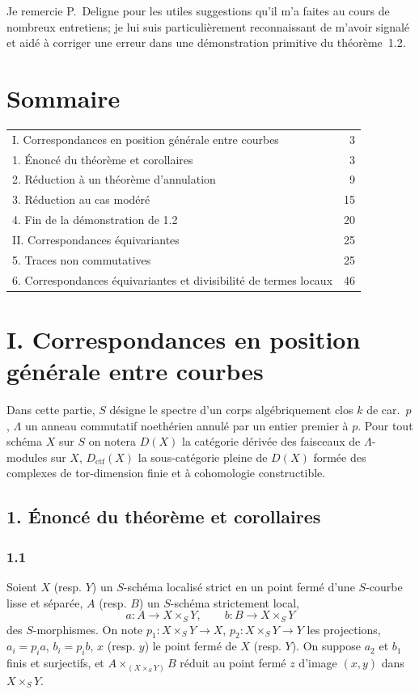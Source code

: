 \documentclass[11pt]{article}
\providecommand{\ctf}{\mathrm{ctf}}
\begin{document}
Je remercie P.~Deligne pour les utiles suggestions qu'il m'a faites au cours de nombreux entretiens; je lui suis particulièrement reconnaissant de m'avoir signalé et aidé à corriger une erreur dans une démonstration primitive du théorème~1.2.

\section*{Sommaire}
\begin{tabular}{@{}p{}r@{}}
I. Correspondances en position générale entre courbes & 3\\
1. Énoncé du théorème et corollaires & 3\\
2. Réduction à un théorème d'annulation & 9\\
3. Réduction au cas modéré & 15\\
4. Fin de la démonstration de 1.2 & 20\\
II. Correspondances équivariantes & 25\\
5. Traces non commutatives & 25\\
6. Correspondances équivariantes et divisibilité de termes locaux & 46
\end{tabular}

\section*{I. Correspondances en position générale entre courbes}

Dans cette partie, $S$ désigne le spectre d'un corps algébriquement clos $k$ de car.~$p$, $\Lambda$ un anneau commutatif noethérien annulé par un entier premier à $p$. Pour tout schéma $X$ sur $S$ on notera $D(X)$ la catégorie dérivée des faisceaux de $\Lambda$-modules sur $X$, $D_{\ctf}(X)$ la sous-catégorie pleine de $D(X)$ formée des complexes de tor-dimension finie et à cohomologie constructible.

\subsection*{1. Énoncé du théorème et corollaires}

\subsubsection*{1.1}
Soient $X$ (resp. $Y$) un $S$-schéma localisé strict en un point fermé d'une $S$-courbe lisse et séparée, $A$ (resp. $B$) un $S$-schéma strictement local,
\[
a:A\longrightarrow X\times_S Y,
\qquad
b:B\longrightarrow X\times_S Y
\]
des $S$-morphismes. On note $p_1:X\times_S Y\to X$, $p_2:X\times_S Y\to Y$ les projections, $a_i=p_i a$, $b_i=p_i b$, $x$ (resp. $y$) le point fermé de $X$ (resp. $Y$). On suppose $a_2$ et $b_1$ finis et surjectifs, et $A\times_{(X\times_S Y)}B$ réduit au point fermé $z$ d'image $(x,y)$ dans $X\times_S Y$.
\end{document}
